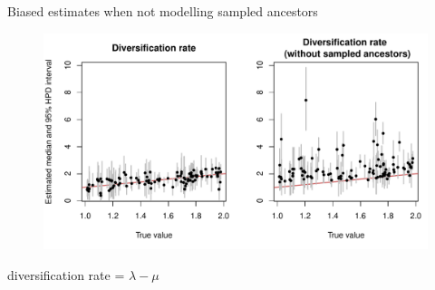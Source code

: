 

\begin{frame}{Biased estimates when not modelling sampled ancestors}

\begin{figure}
\includegraphics[width=\textwidth]{pics/SAvsNoSA/Rplots.pdf}
\end{figure}

\begin{center}
diversification rate = $\lambda-\mu$ 
\end{center}

\end{frame}